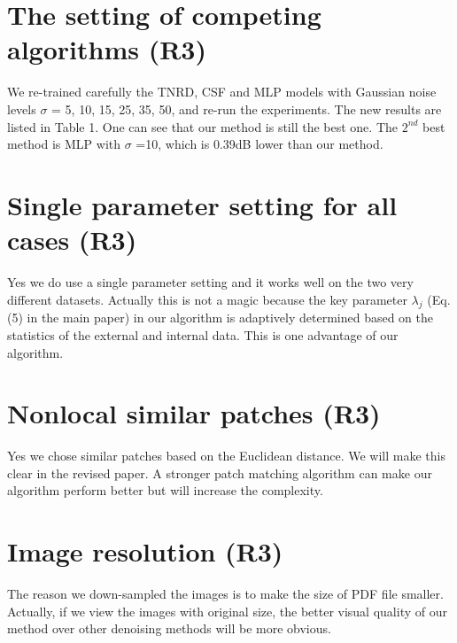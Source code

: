 \documentclass[10pt,twocolumn,letterpaper]{article}
\begin{document}
\section{The setting of competing algorithms (R3)}
We re-trained carefully the TNRD, CSF and MLP models with Gaussian noise levels $\sigma$ = 5, 10, 15, 25, 35, 50, and re-run the experiments. The new results are listed in Table 1. One can see that our method is still the best one. The $2^{nd}$ best method is MLP with $\sigma$ =10, which is 0.39dB lower than our method.

\section{Single parameter setting for all cases (R3)}
Yes we do use a single parameter setting and it works well on the two very different datasets. Actually this is not a magic because the key parameter $\lambda_{j}$ (Eq. (5) in the main paper) in our algorithm is adaptively determined based on the statistics of the external and internal data. This is one advantage of our algorithm.

\section{Nonlocal similar patches (R3)}
Yes we chose similar patches based on the Euclidean distance. We will make this clear in the revised paper. A stronger patch matching algorithm can make our algorithm perform better but will increase the complexity.

\section{Image resolution (R3)}
The reason we down-sampled the images is to make the size of PDF file smaller. Actually, if we view the images with original size, the better visual quality of our method over other denoising methods will be more obvious.

{\small


}
\end{document}
